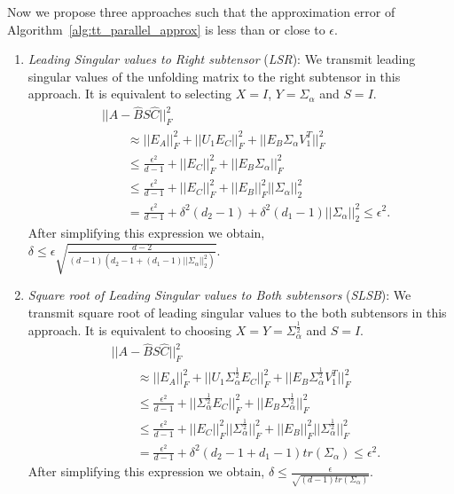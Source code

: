 \documentclass[runningheads]{llncs}
\newcommand{\hfirst}{{\it LSR}\xspace}
\newcommand{\hsecond}{{\it SLSB}\xspace}
\begin{document}
\noindent Now we propose three approaches such that the approximation error of Algorithm~\ref{alg:tt_parallel_approx} is less than or close to $\epsilon$.
\begin{enumerate}
	\item \textit{Leading Singular values to Right subtensor} (\hfirst): We transmit leading singular values of the unfolding matrix to the right subtensor in this approach. It is equivalent to selecting $X = I$, $Y = \Sigma_\alpha$ and $S = I$.	
	\begin{align*}
	&||A - \hat{B} S \hat{C}||_F^2\\ 
	&\qquad\approx ||E_A||_F^2 + ||U_1E_C||_F^2 + ||E_B\Sigma_\alpha V_1^T||_F^2 \\
	&\qquad\le \frac{\epsilon^2}{d-1} + ||E_C||_F^2 + ||E_B\Sigma_\alpha||_F^2 \\
	&\qquad\le \frac{\epsilon^2}{d-1} + ||E_C||_F^2 + ||E_B||_F^2 ||\Sigma_\alpha||_2^2 \\
	&\qquad= \frac{\epsilon^2}{d-1} + \delta^2 (d_2-1)+ \delta^2 (d_1-1) ||\Sigma_\alpha||_2^2\le \epsilon^2.
	\end{align*}
	\noindent After simplifying this expression we obtain, $\delta \le \epsilon \sqrt{\frac{d-2}{(d-1) (d_2 -1 + (d_1-1) ||\Sigma_\alpha||_2^2)}}$.
	
	
	\item \textit{Square root of Leading Singular values to Both subtensors} (\hsecond): We transmit square root of leading singular values to the both subtensors in this approach. It is equivalent to choosing $X=Y=\Sigma_\alpha^{\frac{1}{2}}$ and $S=I$.	
	\begin{align*}
	&||A - \hat{B} S \hat{C}||_F^2\\
	&\qquad\approx ||E_A||_F^2 + ||U_1 \Sigma_\alpha^{\frac{1}{2}} E_C||_F^2 + ||E_B \Sigma_\alpha^{\frac{1}{2}} V_1^T||_F^2 \\
	&\qquad\le \frac{\epsilon^2}{d-1} + ||\Sigma_\alpha^{\frac{1}{2}} E_C||_F^2 + ||E_B \Sigma_\alpha^{\frac{1}{2}}||_F^2 \\
	&\qquad\le \frac{\epsilon^2}{d-1} + ||E_C||_F^2 ||\Sigma_\alpha^{\frac{1}{2}}||_F^2 + ||E_B||_F^2 ||\Sigma_\alpha^{\frac{1}{2}}||_F^2 \\
	&\qquad=\frac{\epsilon^2}{d-1} + \delta^2( d_2-1 + d_1 -1) tr(\Sigma_\alpha)\le \epsilon^2.
	\end{align*} 
	\noindent After simplifying this expression we obtain, $\delta \le \frac{\epsilon}{\sqrt{(d-1)tr(\Sigma_\alpha)}}$.
	

\end{enumerate}
\end{document}
